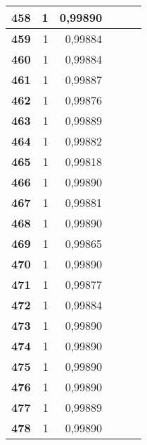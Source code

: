 {\begin{longtable}{|r|r|r|l|r|r|}
\textbf{458} & 1 & 0,99890 &  & \multicolumn{1}{l|}{} & \multicolumn{1}{l|}{} \\ \hline
\textbf{459} & 1 & 0,99884 &  & \multicolumn{1}{l|}{} & \multicolumn{1}{l|}{} \\ \hline
\textbf{460} & 1 & 0,99884 &  & \multicolumn{1}{l|}{} & \multicolumn{1}{l|}{} \\ \hline
\textbf{461} & 1 & 0,99887 &  & \multicolumn{1}{l|}{} & \multicolumn{1}{l|}{} \\ \hline
\textbf{462} & 1 & 0,99876 &  & \multicolumn{1}{l|}{} & \multicolumn{1}{l|}{} \\ \hline
\textbf{463} & 1 & 0,99889 &  & \multicolumn{1}{l|}{} & \multicolumn{1}{l|}{} \\ \hline
\textbf{464} & 1 & 0,99882 &  & \multicolumn{1}{l|}{} & \multicolumn{1}{l|}{} \\ \hline
\textbf{465} & 1 & 0,99818 &  & \multicolumn{1}{l|}{} & \multicolumn{1}{l|}{} \\ \hline
\textbf{466} & 1 & 0,99890 &  & \multicolumn{1}{l|}{} & \multicolumn{1}{l|}{} \\ \hline
\textbf{467} & 1 & 0,99881 &  & \multicolumn{1}{l|}{} & \multicolumn{1}{l|}{} \\ \hline
\textbf{468} & 1 & 0,99890 &  & \multicolumn{1}{l|}{} & \multicolumn{1}{l|}{} \\ \hline
\textbf{469} & 1 & 0,99865 &  & \multicolumn{1}{l|}{} & \multicolumn{1}{l|}{} \\ \hline
\textbf{470} & 1 & 0,99890 &  & \multicolumn{1}{l|}{} & \multicolumn{1}{l|}{} \\ \hline
\textbf{471} & 1 & 0,99877 &  & \multicolumn{1}{l|}{} & \multicolumn{1}{l|}{} \\ \hline
\textbf{472} & 1 & 0,99884 &  & \multicolumn{1}{l|}{} & \multicolumn{1}{l|}{} \\ \hline
\textbf{473} & 1 & 0,99890 &  & \multicolumn{1}{l|}{} & \multicolumn{1}{l|}{} \\ \hline
\textbf{474} & 1 & 0,99890 &  & \multicolumn{1}{l|}{} & \multicolumn{1}{l|}{} \\ \hline
\textbf{475} & 1 & 0,99890 &  & \multicolumn{1}{l|}{} & \multicolumn{1}{l|}{} \\ \hline
\textbf{476} & 1 & 0,99890 &  & \multicolumn{1}{l|}{} & \multicolumn{1}{l|}{} \\ \hline
\textbf{477} & 1 & 0,99889 &  & \multicolumn{1}{l|}{} & \multicolumn{1}{l|}{} \\ \hline
\textbf{478} & 1 & 0,99890 &  & \multicolumn{1}{l|}{} & \multicolumn{1}{l|}{} \\ \hline

\end{longtable}}
